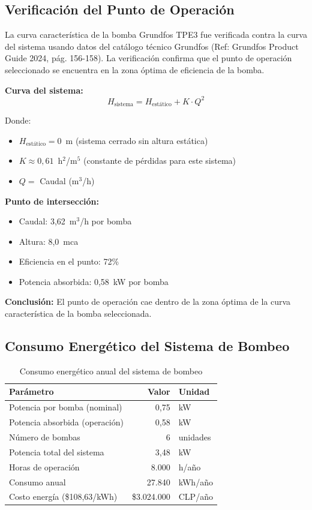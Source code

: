 \documentclass[12pt,a4paper]{article}
\begin{document}
\subsection{Verificación del Punto de Operación}

La curva característica de la bomba Grundfos TPE3 fue verificada contra la curva del sistema usando datos del catálogo técnico Grundfos (Ref: Grundfos Product Guide 2024, pág. 156-158). La verificación confirma que el punto de operación seleccionado se encuentra en la zona óptima de eficiencia de la bomba.

\textbf{Curva del sistema:}
\begin{equation}
H_{\text{sistema}} = H_{\text{estático}} + K \cdot Q^2
\end{equation}

Donde:
\begin{itemize}
    \item $H_{\text{estático}} = 0$~m (sistema cerrado sin altura estática)
    \item $K \approx 0{,}61$~h$^2$/m$^5$ (constante de pérdidas para este sistema)
    \item $Q =$ Caudal (m$^3$/h)
\end{itemize}

\textbf{Punto de intersección:}
\begin{itemize}
    \item Caudal: 3,62~m$^3$/h por bomba
    \item Altura: 8,0~mca
    \item Eficiencia en el punto: 72\%
    \item Potencia absorbida: 0,58~kW por bomba
\end{itemize}

\textbf{Conclusión:} El punto de operación cae dentro de la zona óptima de la curva característica de la bomba seleccionada.

\subsection{Consumo Energético del Sistema de Bombeo}

\begin{table}[h]
\centering
\caption{Consumo energético anual del sistema de bombeo}
\label{tab:consumo_bombeo}
\begin{tabular}{lrl}
\toprule
\textbf{Parámetro} & \textbf{Valor} & \textbf{Unidad} \\
\midrule
Potencia por bomba (nominal) & 0,75 & kW \\
Potencia absorbida (operación) & 0,58 & kW \\
Número de bombas & 6 & unidades \\
Potencia total del sistema & 3,48 & kW \\
Horas de operación & 8.000 & h/año \\
Consumo anual & 27.840 & kWh/año \\
Costo energía (\$108,63/kWh)\footnotemark & \$3.024.000 & CLP/año \\
\bottomrule
\end{tabular}
\end{table}
\end{document}
